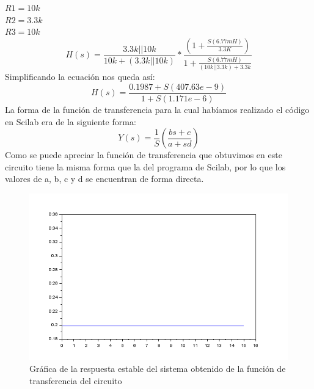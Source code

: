 \documentclass[letterpaper,10pt]{article}
\begin{document}
$R1=10k$\\
$R2=3.3k$\\
$R3=10k$\\
\[H(s)=\frac{3.3k||10k}{10k+(3.3k||10k)}*\frac{(1+\frac{S(6.77mH)}{3.3K})}{1+\frac{S(6.77mH)}{(10k||3.3k)+3.3k}}\]
Simplificando la ecuación nos queda así:
\[H(s)=\frac{0.1987+S(407.63e-9)}{1+S(1.171e-6)}\]
La forma de la función de transferencia para la cual habíamos realizado el código en Scilab era de la siguiente forma:
\[Y(s)=\frac{1}{S}(\frac{bs+c}{a+sd})\]
Como se puede apreciar la función de transferencia que obtuvimos en este circuito tiene la misma forma que la del programa de Scilab, por lo que los valores de a, b, c y d se encuentran de forma directa.
 
\begin{figure}[h!]
	\centering
	\includegraphics[width=0.5\linewidth]{grafica_programa}
	\caption{Gráfica de la respuesta estable del sistema obtenido de la función de transferencia del circuito}
	\label{fig:graficaprograma}
\end{figure}
\FloatBarrier
\end{document}
